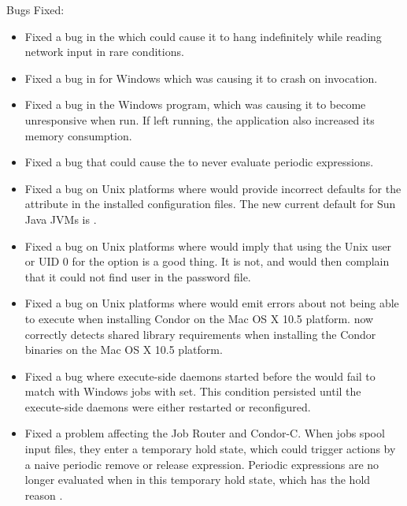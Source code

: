 \noindent Bugs Fixed:

\begin{itemize}

\item Fixed a bug in the  which could cause it
to hang indefinitely while reading network input in rare conditions.

\item Fixed a bug in  for Windows which was causing it
to crash on invocation.

\item Fixed a bug in the Windows  program, which was causing
it to become unresponsive when run.  If left running, the application also
increased its memory consumption.

\item Fixed a bug that could cause the  to never
evaluate periodic expressions.

\item Fixed a bug on Unix platforms where  would
provide incorrect defaults for the 
attribute in the installed configuration files. The new current
default for Sun Java JVMs is .

\item Fixed a bug on Unix platforms where  would
imply that using the Unix user  or UID 0 for the
 option is a good thing.  It is not, and would then complain
that it could not find user  in the password file.

\item Fixed a bug on Unix platforms where  would
emit errors about not being able to execute  when installing
Condor on the Mac OS X 10.5 platform.   now
correctly detects shared library requirements when installing the
Condor binaries on the Mac OS X 10.5 platform.

\item Fixed a bug where execute-side daemons started before the
 would fail to match with Windows jobs with
 set.  This condition persisted until the
execute-side daemons were either restarted or reconfigured.

\item Fixed a problem affecting the Job Router and Condor-C.  When jobs
spool input files, they enter a temporary hold state, which could
trigger actions by a naive periodic remove or release expression.
Periodic expressions are no longer evaluated when in this temporary
hold state, which has the hold reason .


\end{itemize}
